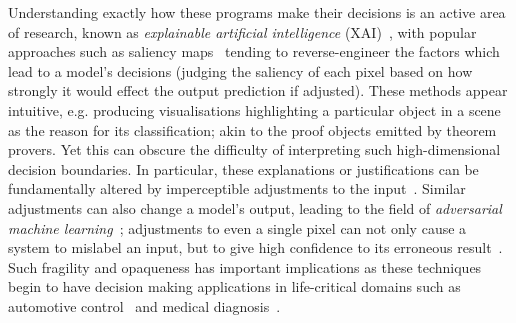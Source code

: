 \documentclass{article}
\begin{document}
Understanding exactly how these programs make their decisions is an active area
of research, known as \emph{explainable artificial intelligence}
(XAI)~\cite{dovsilovic2018explainable,doshi2017towards,molnar2018interpretable},
with popular approaches such as saliency maps~\cite{simonyan2013deep} tending to
reverse-engineer the factors which lead to a model's decisions (judging the
saliency of each pixel based on how strongly it would effect the output
prediction if adjusted). These methods appear intuitive, e.g. producing
visualisations highlighting a particular object in a scene as the reason for its
classification; akin to the proof objects emitted by theorem provers. Yet this
can obscure the difficulty of interpreting such high-dimensional decision
boundaries. In particular, these explanations or justifications can be
fundamentally altered by imperceptible adjustments to the
input~\cite{ghorbani2017interpretation}. Similar adjustments can also change a
model's output, leading to the field of \emph{adversarial machine
  learning}~\cite{goodfellow2014explaining}; adjustments to even a single pixel
can not only cause a system to mislabel an input, but to give high confidence to
its erroneous result~\cite{su2019one}. Such fragility and opaqueness has
important implications as these techniques begin to have decision making
applications in life-critical domains such as automotive
control~\cite{bojarski2016end} and medical
diagnosis~\cite{esteva2017dermatologist}.



\end{document}
